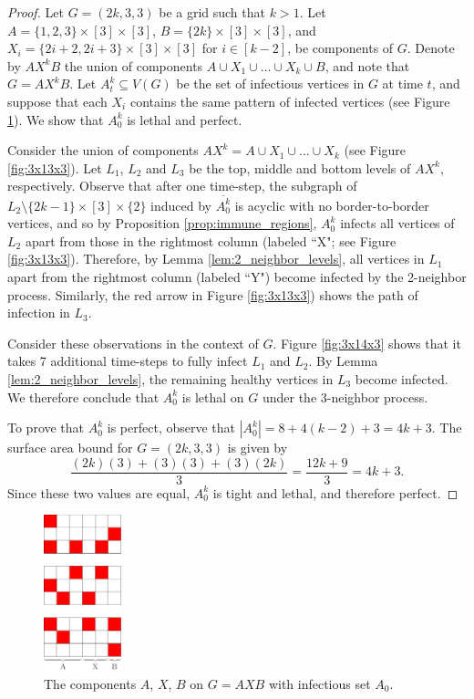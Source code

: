 \begin{proof}
Let $G=(2k,3,3)$ be a grid such that $k > 1$. Let $A = \{1,2,3\} \times [3] \times [3]$, $B = \{2k\} \times [3] \times [3]$, and $X_i = \{2i+2,2i+3\} \times [3] \times [3]$ for $i \in [k-2]$, be components of $G$. Denote by $AX^kB$ the union of components $A \cup X_1 \cup \dots \cup X_{k} \cup B$, and note that $G=AX^kB$. Let $A_t^k \subseteq V(G)$ be the set of infectious vertices in $G$ at time $t$, and suppose that each $X_i$ contains the same pattern of infected vertices (see Figure \ref{fig:3x6x3}). We show that $A_0^k$ is lethal and perfect. 

Consider the union of components $AX^k = A \cup X_1 \cup \dots \cup X_{k}$ (see Figure \ref{fig:3x13x3}). Let $L_1$, $L_2$ and $L_3$ be the top, middle and bottom levels of $AX^k$, respectively. Observe that after one time-step, the subgraph of $L_2 \setminus \{2k-1\} \times [3] \times \{2\}$ induced by $\overline{A_0^k}$ is acyclic with no border-to-border vertices, and so by Proposition \ref{prop:immune_regions}, $A_0^k$ infects all vertices of $L_2$ apart from those in the rightmost column (labeled ``X"; see Figure \ref{fig:3x13x3}). Therefore, by Lemma \ref{lem:2_neighbor_levels}, all vertices in $L_1$ apart from the rightmost column (labeled ``Y") become infected by the 2-neighbor process. Similarly, the red arrow in Figure \ref{fig:3x13x3}) shows the path of infection in $L_3$. 

Consider these observations in the context of $G$. Figure \ref{fig:3x14x3} shows that it takes 7 additional time-steps to fully infect $L_1$ and $L_2$. By Lemma \ref{lem:2_neighbor_levels}, the remaining healthy vertices in $L_3$ become infected. We therefore conclude that $A_0^k$ is lethal on $G$ under the 3-neighbor process.

To prove that $A_0^k$ is perfect, observe that $|A_0^k| = 8 + 4(k-2) + 3=4k+3$. The surface area bound for $G=(2k,3,3)$ is given by
$$\frac{(2k)(3) + (3)(3) + (3)(2k)}{3} = \frac{12k + 9}{3} = 4k+3.$$
Since these two values are equal, $A_0^k$ is tight and lethal, and therefore perfect.
\end{proof}

\begin{figure}[]
\centering
\includegraphics[width=0.2\textwidth]{figures/7/3x6x3.pdf}
\caption{The components $A$, $X$, $B$ on $G=AXB$ with infectious set $A_0$.}
\label{fig:3x6x3}
\end{figure} 

